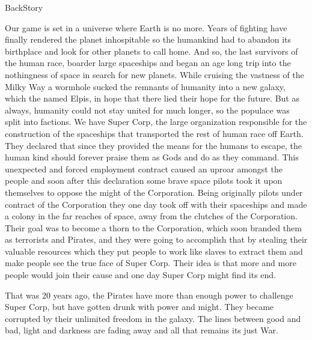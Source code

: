 \documentclass[11pt,a4paper]{article}
\begin{document}
        BackStory

        Our game is set in a universe where Earth is no more. Years of fighting have finally rendered the planet inhospitable so the humankind had to abandon its birthplace and look for other planets to call home. And so, the last survivors of the human race, boarder large spaceships and began an age long trip into the nothingness of space in search for new planets. While cruising the vastness of the Milky Way a wormhole sucked the remnants of humanity into a new galaxy, which the named Elpis, in hope that there lied their hope for the future. But as always, humanity could not stay united for much longer, so the populace was split into factions. We have Super Corp, the large organization responsible for the construction of the spaceships that transported the rest of human race off Earth. They declared that since they provided the means for the humans to escape, the human kind should forever praise them as Gods and do as they command. This unexpected and forced employment contract caused an uproar amongst the people and soon after this declaration some brave space pilots took it upon themselves to oppose the might of the Corporation. Being originally pilots under contract of the Corporation they one day took off with their spaceships and made a colony in the far reaches of space, away from the clutches of the Corporation. Their goal was to become a thorn to the Corporation, which soon branded them as terrorists and Pirates, and they were going to accomplish that by stealing their valuable resources which they put people to work like slaves to extract them and make people see the true face of Super Corp. Their idea is that more and more people would join their cause and one day Super Corp might find its end.

        That was 20 years ago, the Pirates have more than enough power to challenge Super Corp, but have gotten drunk with power and might. They became corrupted by their unlimited freedom in the galaxy. The lines between good and bad, light and darkness are fading away and all that remains its just War.
\end{document}
